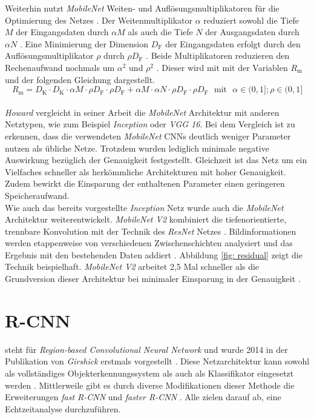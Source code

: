 		
		Weiterhin nutzt \textit{MobileNet} Weiten- und Auflösungsmultiplikatoren für die Optimierung des Netzes \cite{mobilenets}. Der Weitenmultiplikator $\alpha$ reduziert sowohl die Tiefe $M$ der Eingangsdaten durch $\alpha M$ als auch die Tiefe $N$ der Ausgangsdaten durch $\alpha N$ \cite{mobilenets}. Eine Minimierung der Dimension $D_\text{F}$ der Eingangsdaten erfolgt durch den Auflösungsmultiplikator $\rho$ durch $\rho D_\text{F}$ \cite{mobilenets}. Beide Multiplikatoren reduzieren den Rechenaufwand nochmals um $\alpha^2$ und $\rho^2$ \cite{mobilenets}. Dieser wird mit mit der Variablen $R_\text{m}$ und der folgenden Gleichung dargestellt. \\
		
		\begin{equation}
			R_\text{m}=D_\text{K} \cdot D_\text{K} \cdot \alpha M \cdot \rho D_\text{F} \cdot \rho D_\text{F} + \alpha M \cdot \alpha N \cdot \rho D_\text{F} \cdot \rho D_\text{F} \text{  }\text{mit}\text{  } \alpha \in (0,1] ; \rho \in (0,1]
			\label{eq: rechenaufwand w}
		\end{equation}\\
	
		\textit{Howard} vergleicht in seiner Arbeit die \textit{MobileNet} Architektur mit anderen Netztypen, wie zum Beispiel \textit{Inception} oder \textit{VGG 16}. Bei dem Vergleich ist zu erkennen, dass die verwendeten \textit{MobileNet} CNNs deutlich weniger Parameter nutzen als übliche Netze. Trotzdem wurden lediglich minimale negative Auswirkung bezüglich der Genauigkeit festgestellt. Gleichzeit ist das Netz um ein Vielfaches schneller als herkömmliche Architekturen mit hoher Genauigkeit. Zudem bewirkt die Einsparung der enthaltenen Parameter einen geringeren Speicheraufwand. \\
		
		Wie auch das bereits vorgestellte \textit{Inception} Netz wurde auch die \textit{MobileNet} Architektur weiterentwickelt. \textit{MobileNet V2} kombiniert die tiefenorientierte, trennbare Konvolution mit der Technik des \textit{ResNet} Netzes \cite{mobilenetv2}. Bildinformationen werden etappenweise von verschiedenen Zwischenschichten analysiert und das Ergebnis mit den bestehenden Daten addiert \cite{mobilenetv2}. Abbildung \ref{fig: residual} zeigt die Technik beispielhaft. \textit{MobileNet V2} arbeitet 2,5 Mal schneller als die Grundversion dieser Architektur bei minimaler Einsparung in der Genauigkeit \cite{mobilenetv2}.
		
	
		\section*{R-CNN}
		 steht für \textit{Region-based Convolutional Neural Network} und wurde 2014 in der Publikation von \textit{Girshick} erstmals vorgestellt \cite{rcnn}. Diese Netzarchitektur kann sowohl als vollständiges Objekterkennungssystem als auch als Klassifikator eingesetzt werden \cite{rcnn,rcnnarchitektur}. Mittlerweile gibt es durch diverse Modifikationen dieser Methode die Erweiterungen \textit{fast R-CNN} und \textit{faster R-CNN} \cite{fastrcnn,fasterrcnn}. Alle zielen darauf ab, eine Echtzeitanalyse durchzuführen.\\
		
